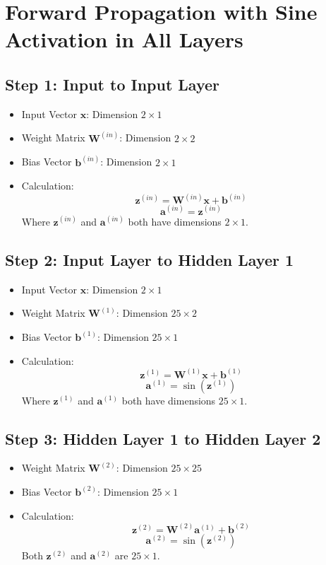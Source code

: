 \documentclass{article}
\begin{document}
\section*{Forward Propagation with Sine Activation in All Layers}

\subsection*{Step 1: Input to Input Layer}
\begin{itemize}
  \item Input Vector $\mathbf{x}$: Dimension $2 \times 1$
  \item Weight Matrix $\mathbf{W}^{(in)}$: Dimension $2 \times 2$
  \item Bias Vector $\mathbf{b}^{(in)}$: Dimension $2 \times 1$
  \item Calculation:
  \[
  \mathbf{z}^{(in)} = \mathbf{W}^{(in)} \mathbf{x} + \mathbf{b}^{(in)}
  \]
  \[
  \mathbf{a}^{(in)} = \mathbf{z}^{(in)}
  \]
  Where $\mathbf{z}^{(in)}$ and $\mathbf{a}^{(in)}$ both have dimensions $2 \times 1$.
\end{itemize}


\subsection*{Step 2: Input Layer to Hidden Layer 1}
\begin{itemize}
  \item Input Vector $\mathbf{x}$: Dimension $2 \times 1$
  \item Weight Matrix $\mathbf{W}^{(1)}$: Dimension $25 \times 2$
  \item Bias Vector $\mathbf{b}^{(1)}$: Dimension $25 \times 1$
  \item Calculation:
  \[
  \mathbf{z}^{(1)} = \mathbf{W}^{(1)} \mathbf{x} + \mathbf{b}^{(1)}
  \]
  \[
  \mathbf{a}^{(1)} = \sin(\mathbf{z}^{(1)})
  \]
  Where $\mathbf{z}^{(1)}$ and $\mathbf{a}^{(1)}$ both have dimensions $25 \times 1$.
\end{itemize}

\subsection*{Step 3: Hidden Layer 1 to Hidden Layer 2}
\begin{itemize}
  \item Weight Matrix $\mathbf{W}^{(2)}$: Dimension $25 \times 25$
  \item Bias Vector $\mathbf{b}^{(2)}$: Dimension $25 \times 1$
  \item Calculation:
  \[
  \mathbf{z}^{(2)} = \mathbf{W}^{(2)} \mathbf{a}^{(1)} + \mathbf{b}^{(2)}
  \]
  \[
  \mathbf{a}^{(2)} = \sin(\mathbf{z}^{(2)})
  \]
  Both $\mathbf{z}^{(2)}$ and $\mathbf{a}^{(2)}$ are $25 \times 1$.
\end{itemize}
\end{document}
